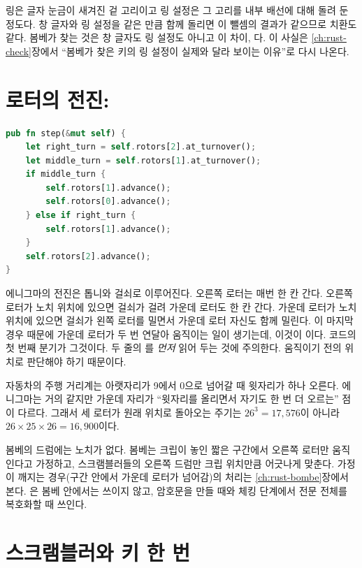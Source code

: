 링은 글자 눈금이 새겨진 겉 고리이고 링 설정은 그 고리를 내부 배선에 대해 돌려 둔 정도다. 창 글자와 링
설정을 같은 만큼 함께 돌리면 이 뺄셈의 결과가 같으므로 치환도 같다. 봄베가 찾는 것은 창 글자도 링 설정도
아니고 이 차이, 다. 이 사실은 \ref{ch:rust-check}장에서 ``봄베가 찾은 키의 링
설정이 실제와 달라 보이는 이유''로 다시 나온다.

\section{로터의 전진: \texorpdfstring{}{step}}

\begin{lstlisting}[language=Rust,caption={\code{enigma.rs}: 키를 한 번 누를 때의 전진. \code{rotors[0]}이 왼쪽, \code{[2]}가 오른쪽이다.},label={lst:step}]
pub fn step(&mut self) {
    let right_turn = self.rotors[2].at_turnover();
    let middle_turn = self.rotors[1].at_turnover();
    if middle_turn {
        self.rotors[1].advance();
        self.rotors[0].advance();
    } else if right_turn {
        self.rotors[1].advance();
    }
    self.rotors[2].advance();
}
\end{lstlisting}

\Why 에니그마의 전진은 톱니와 걸쇠로 이루어진다. 오른쪽 로터는 매번 한 칸 간다. 오른쪽 로터가 노치 위치에
있으면 걸쇠가 걸려 가운데 로터도 한 칸 간다. 가운데 로터가 노치 위치에 있으면 걸쇠가 왼쪽 로터를 밀면서
가운데 로터 자신도 함께 밀린다. 이 마지막 경우 때문에 가운데 로터가 두 번 연달아 움직이는 일이 생기는데,
이것이 이다. 코드의 첫 번째 분기가 그것이다. 두 줄의 를
\emph{먼저} 읽어 두는 것에 주의한다. 움직이기 전의 위치로 판단해야 하기 때문이다.

\General 자동차의 주행 거리계는 아랫자리가 9에서 0으로 넘어갈 때 윗자리가 하나 오른다. 에니그마는 거의
같지만 가운데 자리가 ``윗자리를 올리면서 자기도 한 번 더 오르는'' 점이 다르다. 그래서 세 로터가 원래 위치로
돌아오는 주기는 $26^3 = 17{,}576$이 아니라 $26 \times 25 \times 26 = 16{,}900$이다.

\Ours 봄베의 드럼에는 노치가 없다. 봄베는 크립이 놓인 짧은 구간에서 오른쪽 로터만 움직인다고 가정하고,
스크램블러들의 오른쪽 드럼만 크립 위치만큼 어긋나게 맞춘다. 가정이 깨지는 경우(구간 안에서 가운데 로터가
넘어감)의 처리는 \ref{ch:rust-bombe}장에서 본다. 은 봄베 안에서는 쓰이지 않고, 암호문을 만들 때와
체킹 단계에서 전문 전체를 복호화할 때 쓰인다.

\section{스크램블러와 키 한 번}

